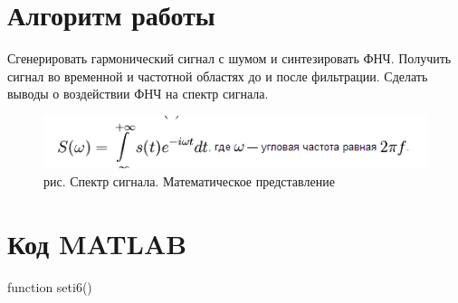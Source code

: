 \documentclass[10pt,a4paper]{report}
\begin{document}
\section{Алгоритм работы}
Сгенерировать гармонический сигнал с шумом и синтезировать ФНЧ. Получить сигнал во временной и частотной областях до и после фильтрации. Сделать выводы о воздействии ФНЧ на  спектр сигнала.
\begin{figure}
\begin{center}
\includegraphics[angle=0, scale = 0.8]{20.png}\newline
рис.    Спектр сигнала. Математическое представление \newline
\end{center}
\end{figure}
\section{Код MATLAB}
function seti6() \newline
\end{document}
